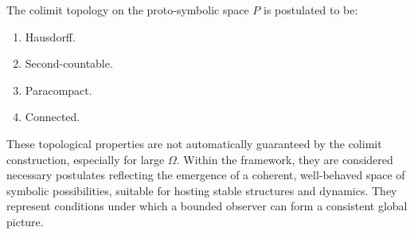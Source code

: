 \begin{axiom}
\label{axiom:bk1_topological_regularity}
The colimit topology on the proto-symbolic space $P$ is postulated to be:
\begin{enumerate}
    \item Hausdorff.
    \item Second-countable.
    \item Paracompact.
    \item Connected.
\end{enumerate}
\end{axiom}
\begin{remark}
These topological properties are not automatically guaranteed by the colimit construction, especially for large $\Omega$. Within the framework, they are considered necessary postulates reflecting the emergence of a coherent, well-behaved space of symbolic possibilities, suitable for hosting stable structures and dynamics. They represent conditions under which a bounded observer can form a consistent global picture.
\end{remark}
